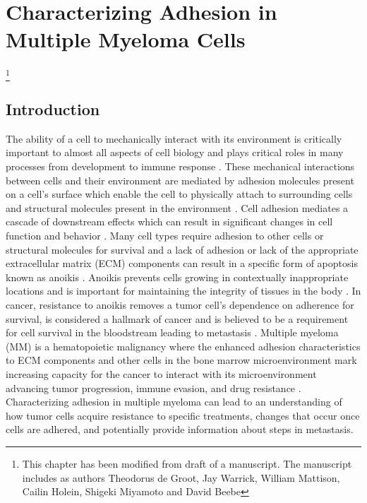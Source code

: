 \chapter{Characterizing Adhesion in Multiple Myeloma Cells}
\label{Chap:Adhesion}\footnote{This chapter has been modified from draft of a manuscript. The manuscript includes as authors Theodorus de Groot, Jay Warrick, William Mattison, Cailin Holein, Shigeki Miyamoto and David Beebe}

\section{Introduction}The ability of a cell to mechanically interact with its environment is critically important to almost all aspects of cell biology and plays critical roles in many processes from development to immune response \cite{Halbleib2006,Springer1990,Springer1987}. These mechanical interactions between cells and their environment are mediated by adhesion molecules present on a cell's surface which enable the cell to physically attach to surrounding cells and structural molecules present in the environment \cite{Hay2013, Gumbiner1996}. Cell adhesion mediates a cascade of downstream effects which can result in significant changes in cell function and behavior \cite{Schlie-Wolter2013}. Many cell types require adhesion to other cells or structural molecules for survival and a lack of adhesion or lack of the appropriate extracellular matrix (ECM) components can result in a specific form of apoptosis known as anoikis \cite{Gilmore2005}. Anoikis prevents cells growing in contextually inappropriate locations and is important for maintaining the integrity of tissues in the body \cite{Gilmore2005}. In cancer, resistance to anoikis removes a tumor cell's dependence on adherence for survival, is considered a hallmark of cancer and is believed to be a requirement for cell survival in the bloodstream leading to metastasis \cite{Paoli20133481}. Multiple myeloma (MM) is a hematopoietic malignancy where the enhanced adhesion characteristics to ECM components and other cells in the bone marrow microenvironment mark increasing capacity for the cancer to interact with its microenvironment advancing tumor progression, immune evasion, and drug resistance \cite{Chauhan1996, Damiano2000, Gorgun2013, Jourdan1998b, Shain2001}. Characterizing adhesion in multiple myeloma can lead to an understanding of how tumor cells acquire resistance to specific treatments, changes that occur once cells are adhered, and potentially provide information about steps in metastasis.

